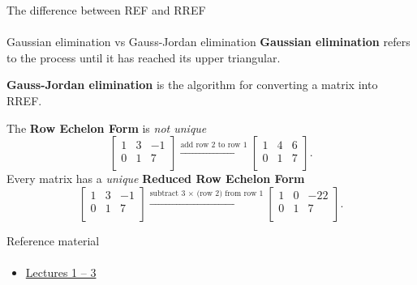 \documentclass[aspectratio=169]{beamer}
\newcommand{\fbckg}[1]{\usebackgroundtemplate{\texttt{[image: \#1]}}}%
\begin{document}
\begin{frame}[t]{The difference between REF and RREF}
\framesubtitle{}
\begin{block}{Gaussian elimination vs Gauss-Jordan elimination}
    \textbf{Gaussian elimination} refers to the process until it has reached its upper triangular.

    \textbf{Gauss-Jordan elimination} is the algorithm for converting a matrix into RREF.
\end{block}
The \textbf{Row Echelon Form} is \textit{not unique}
\vspace{-7pt}
    \begin{equation*}
        \begin{bmatrix} 1 & 3 & -1 \\ 0 & 1 & 7 \\ \end{bmatrix} 
        \xrightarrow{\text{add row 2 to row 1}}
        \begin{bmatrix} 1 & 4 & 6 \\ 0 & 1 & 7 \\ \end{bmatrix}. 
    \end{equation*}
   Every matrix has a \textit{ unique} \textbf{Reduced Row Echelon Form}
\vspace{-7pt} 
   \begin{equation*}
        {\displaystyle {\begin{bmatrix}1&3&-1\\0&1&7\\\end{bmatrix}}{\xrightarrow {\text{subtract 3 × (row 2) from row 1}}}{\begin{bmatrix}1&0&-22\\0&1&7\\\end{bmatrix}}.}
    \end{equation*}
\end{frame}


\begin{frame}[t]{Reference material}
\framesubtitle{}
\Large
    \begin{itemize}
        \item \href{https://ocw.mit.edu/courses/mathematics/18-06-linear-algebra-spring-2010/video-lectures/}{Lectures 1 -- 3}
    \end{itemize}
\end{frame}


\fbckg{fibeamer/figs/last_page.png}
\frame[plain]{}
\end{document}
